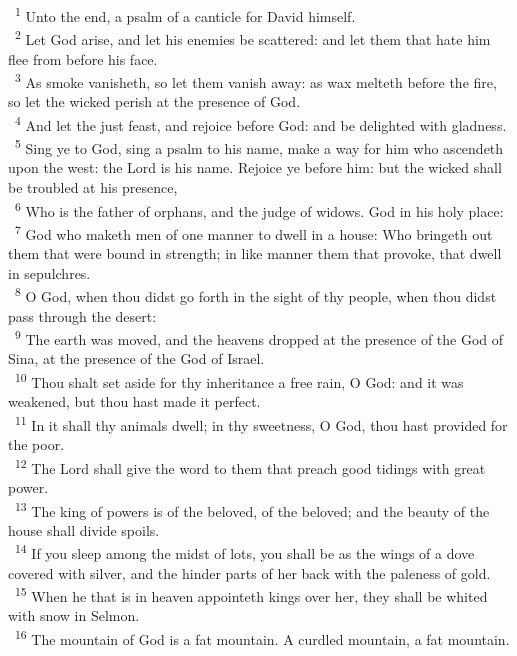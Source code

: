 \documentclass[a5paper,12pt]{article}
\begin{document}
\begin{multicols*}{2}
~\textsuperscript{1} Unto the end, a psalm of a canticle for David himself.\\
~\textsuperscript{2} Let God arise, and let his enemies be scattered: and let them that hate him flee from before his face.\\
~\textsuperscript{3} As smoke vanisheth, so let them vanish away: as wax melteth before the fire, so let the wicked perish at the presence of God.\\
~\textsuperscript{4} And let the just feast, and rejoice before God: and be delighted with gladness.\\
~\textsuperscript{5} Sing ye to God, sing a psalm to his name, make a way for him who ascendeth upon the west: the Lord is his name. Rejoice ye before him: but the wicked shall be troubled at his presence,\\
~\textsuperscript{6} Who is the father of orphans, and the judge of widows. God in his holy place:\\
~\textsuperscript{7} God who maketh men of one manner to dwell in a house: Who bringeth out them that were bound in strength; in like manner them that provoke, that dwell in sepulchres.\\
~\textsuperscript{8} O God, when thou didst go forth in the sight of thy people, when thou didst pass through the desert:\\
~\textsuperscript{9} The earth was moved, and the heavens dropped at the presence of the God of Sina, at the presence of the God of Israel.\\
~\textsuperscript{10} Thou shalt set aside for thy inheritance a free rain, O God: and it was weakened, but thou hast made it perfect.\\
~\textsuperscript{11} In it shall thy animals dwell; in thy sweetness, O God, thou hast provided for the poor.\\
~\textsuperscript{12} The Lord shall give the word to them that preach good tidings with great power.\\
~\textsuperscript{13} The king of powers is of the beloved, of the beloved; and the beauty of the house shall divide spoils.\\
~\textsuperscript{14} If you sleep among the midst of lots, you shall be as the wings of a dove covered with silver, and the hinder parts of her back with the paleness of gold.\\
~\textsuperscript{15} When he that is in heaven appointeth kings over her, they shall be whited with snow in Selmon.\\
~\textsuperscript{16} The mountain of God is a fat mountain. A curdled mountain, a fat mountain.\\

\end{multicols*}
\end{document}
